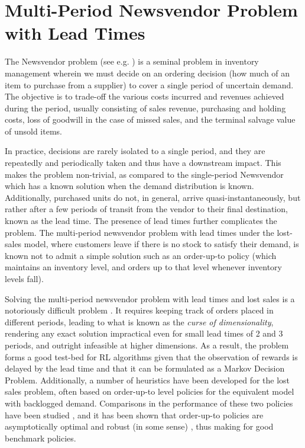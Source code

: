 \section{Multi-Period Newsvendor Problem with Lead Times}
\label{sec:newsvendor}

The Newsvendor problem (see e.g. \cite{zipkin2000foundations}) is a seminal problem in inventory management wherein we must decide on an ordering decision (how much of an item to purchase from a supplier) to cover a single period of uncertain demand. The objective is to trade-off the various costs incurred and revenues achieved during the period, usually consisting of sales revenue, purchasing and holding costs, loss of goodwill in the case of missed sales, and the terminal salvage value of unsold items.

In practice, decisions are rarely isolated to a single period, and they are repeatedly and periodically taken and thus have a downstream impact. This makes the problem non-trivial, as compared to the single-period Newsvendor which has a known solution when the demand distribution is known. Additionally, purchased units do not, in general, arrive quasi-instantaneously, but rather after a few periods of transit from the vendor to their final destination, known as the lead time. The presence of lead times further complicates the problem. The multi-period newsvendor problem with lead times under the lost-sales model, where customers leave if there is no stock to satisfy their demand, is known not to admit a simple solution such as an order-up-to policy (which maintains an inventory level, and orders up to that level whenever inventory levels fall).


Solving the multi-period newsvendor problem with lead times and lost sales is a notoriously difficult problem \citep{zipkin2008old}. It requires keeping track of orders placed in different periods, leading to what is known as the \emph{curse of dimensionality}, rendering any exact solution impractical even for small lead times of 2 and 3 periods, and outright infeasible at higher dimensions. As a result, the problem forms a good test-bed for RL algorithms given that the observation of rewards is delayed by the lead time and that it can be formulated as a Markov Decision Problem. Additionally, a number of heuristics have been developed for the lost sales problem, often based on order-up-to level policies for the equivalent model with backlogged demand. Comparisons in the performance of these two policies have been studied \cite{janakiraman2007comparison}, and it has been shown that order-up-to policies are asymptotically optimal and robust (in some sense) \cite{huh2009asymptotic,bijvank2014robustness}, thus making for good benchmark policies.

